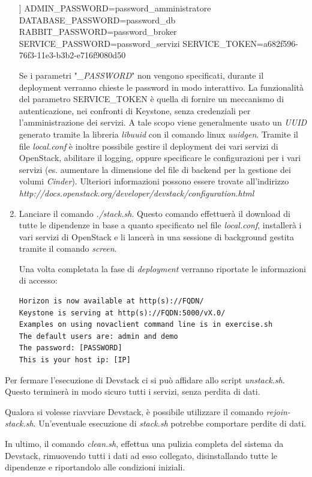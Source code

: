 \documentclass[../main.tex]{subfiles}
\begin{document}
\begin{enumerate}
\begin{python}
[[local|localrc]]
ADMIN_PASSWORD=password_amministratore
DATABASE_PASSWORD=password_db
RABBIT_PASSWORD=password_broker
SERVICE_PASSWORD=password_servizi
SERVICE_TOKEN=a682f596-76f3-11e3-b3b2-e716f9080d50
\end{python}
Se i parametri "\textit{\_PASSWORD}" non vengono specificati, durante il deployment verranno chieste le password in modo interattivo.
La funzionalità del parametro SERVICE\_TOKEN è quella di fornire un meccanismo di autenticazione, nei confronti di Keystone, senza credenziali per l'amministrazione dei servizi. A tale scopo viene generalmente usato un \textit{UUID} generato tramite la libreria \textit{libuuid} con il comando linux \textit{uuidgen}.
Tramite il file \textit{local.conf} è inoltre possibile gestire il deployment dei vari servizi di OpenStack, abilitare il logging, oppure specificare le configurazioni per i vari servizi (es. aumentare la dimensione del file di backend per la gestione dei volumi \textit{Cinder}).
Ulteriori informazioni possono essere trovate all'indirizzo \textit{http://docs.openstack.org/developer/devstack/configuration.html}
\item Lanciare il comando \textit{./stack.sh}.
Questo comando effettuerà il download di tutte le dipendenze in base a quanto specificato nel file \textit{local.conf}, installerà i vari servizi di OpenStack e li lancerà in una sessione di background gestita tramite il comando \textit{screen}.

Una volta completata la fase di \textit{deployment} verranno riportate le informazioni di accesso:
\begin{verbatim}
Horizon is now available at http(s)://FQDN/
Keystone is serving at http(s)://FQDN:5000/vX.0/
Examples on using novaclient command line is in exercise.sh
The default users are: admin and demo
The password: [PASSWORD]
This is your host ip: [IP]
\end{verbatim}
\end{enumerate}
Per fermare l'esecuzione di Devstack ci si può affidare allo script \textit{unstack.sh}. Questo terminerà in modo sicuro tutti i servizi, senza perdita di dati.

Qualora si volesse riavviare Devstack, è possibile utilizzare il comando \textit{rejoin-stack.sh}. Un'eventuale esecuzione di \textit{stack.sh} potrebbe comportare perdite di dati.

In ultimo, il comando \textit{clean.sh}, effettua una pulizia completa del sistema da Devstack, rimuovendo tutti i dati ad esso collegato, disinstallando tutte le dipendenze e riportandolo alle condizioni iniziali.
\end{document}
